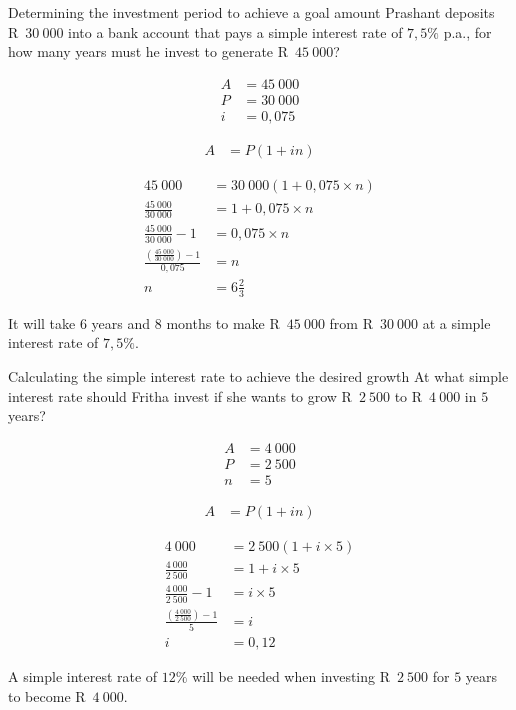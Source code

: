 \begin{wex}{Determining the investment period to achieve a goal amount}
{Prashant deposits R~$30~000$ into a bank account that pays a simple
  interest rate of $7,5\%$ p.a., for how many years must he invest to
  generate R~$45~000$?}
{
    \begin{align*}
	A &= 45~000\\
	P &= 30~000\\
	i &= 0,075
    \end{align*}

    \begin{align*}
	A &= P(1 + in)
    \end{align*}

    \begin{align*}
	45~000 &= 30~000(1 + 0,075 \times n)\\
	\frac{45~000}{30~000} &= 1 + 0,075 \times n \\[5pt]
	\frac{45~000}{30~000} -1 &= 0,075 \times n\\[5pt]
	\frac{(\frac{45~000}{30~000}) -1}{0,075} &= n\\
	n &= 6\frac{2}{3}
    \end{align*}

    It will take $6$ years and $8$ months to make R~$45~000$ from R~$30~000$ at a simple interest rate of $7,5\%$.
    }
\end{wex}



\begin{wex}{Calculating the simple interest rate to achieve the
    desired growth}
{At what simple interest rate should Fritha invest if she wants to
  grow R~$2~500$ to R~$4~000$ in $5$ years?}
{
    \begin{align*}
	A &= 4~000\\
	P &= 2~500\\
	n &= 5
    \end{align*}

    \begin{align*}
	A &= P(1 + in)
    \end{align*}

    \begin{align*}
	4~000 &= 2~500(1 + i \times 5)\\
	\frac{4~000}{2~500} &= 1 + i \times 5\\[5pt]
	\frac{4~000}{2~500} - 1&= i \times 5\\[5pt]
	\frac{(\frac{4~000}{2~500}) - 1}{5} &= i\\
	i &= 0,12
    \end{align*}

    A simple interest rate of $12\%$ will be needed when investing R~$2~500$ for $5$ years to become R~$4~000$.
    }
\end{wex}

